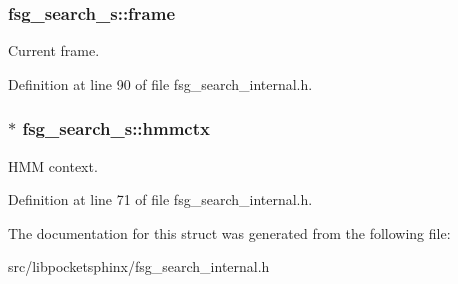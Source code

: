 \subsubsection[{frame}]{ fsg\+\_\+search\+\_\+s\+::frame}\label{structfsg__search__s_acdac4164d14d531b14c11a823dd22893}


Current frame. 



Definition at line 90 of file fsg\+\_\+search\+\_\+internal.\+h.

\subsubsection[{hmmctx}]{$\ast$ fsg\+\_\+search\+\_\+s\+::hmmctx}\label{structfsg__search__s_a7407bdf5f311caf9d46817b3387b798c}


H\+M\+M context. 



Definition at line 71 of file fsg\+\_\+search\+\_\+internal.\+h.



The documentation for this struct was generated from the following file\+:\begin{DoxyCompactItemize}
\item 
src/libpocketsphinx/fsg\+\_\+search\+\_\+internal.\+h\end{DoxyCompactItemize}
